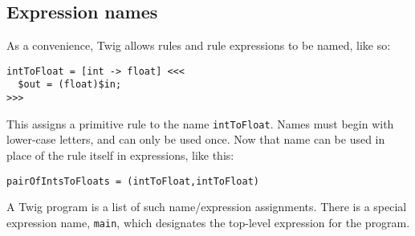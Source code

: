 \subsection{Expression names}
\label{section:names}

As a convenience, Twig allows rules and rule expressions to be named, like so:

\begin{verbatim}
intToFloat = [int -> float] <<<
  $out = (float)$in;
>>>
\end{verbatim}

This assigns a primitive rule to the name \texttt{intToFloat}. Names must begin with lower-case letters, and can only be used once. Now that name can be used in place of the rule itself in expressions, like this:

\begin{verbatim}
pairOfIntsToFloats = (intToFloat,intToFloat)
\end{verbatim}

A Twig program is a list of such name/expression assignments. There is a special expression name, \texttt{main}, which designates the top-level expression for the program.

% 
% 
